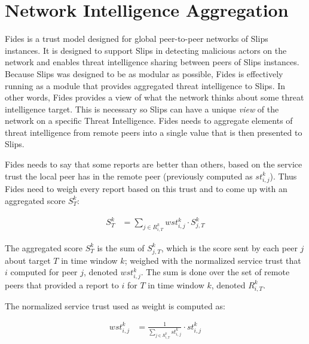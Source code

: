 \section{Network Intelligence Aggregation}
\label{sec:network-intelligence-aggregation}
Fides is a trust model designed for global peer-to-peer networks of Slips instances.
It is designed to support Slips in detecting malicious actors on the network and enables threat intelligence sharing between peers of Slips instances.
Because Slips was designed to be as modular as possible, Fides is effectively running as a module that provides aggregated threat intelligence to Slips. 
In other words, Fides provides a view of what the network thinks about some threat intelligence target. This is necessary so Slips can have a unique \textit{view} of the network on a specific Threat Intelligence.
Fides needs to aggregate elements of threat intelligence from remote peers into a single value that is then presented to Slips.



Fides needs to say that some reports are better than others, based on the service trust the local peer has in the remote peer (previously computed as $st^{k}_{i, j}$).
Thus Fides need to weigh every report based on this trust and to come up with an aggregated score $S^{k}_{T}$:

\begin{equation}
\begin{split}
    S^{k}_{T} &= \sum_{{j}\in R^{k}_{i, T}} wst^{k}_{i, j} \cdot S^{k}_{j, T}
\end{split}
\end{equation}

The aggregated score $S^{k}_{T}$ is the sum of $S^{k}_{j, T}$, which is the score sent by each peer $j$ about target $T$ in time window $k$; weighed with the normalized service trust that $i$ computed for peer $j$, denoted $wst^{k}_{i, j}$. The sum is done over the set of remote peers that provided a report to $i$ for $T$ in time window $k$, denoted $R^{k}_{i, T}$.

The normalized service trust used as weight is computed as:

\begin{equation}
\begin{split}
    wst^{k}_{i,j} &= \frac{1}{\sum_{{j}\in R^{k}_{i, T}} st^{k}_{i, j}} \cdot st^{k}_{i, j} \\
\end{split}
\end{equation}

